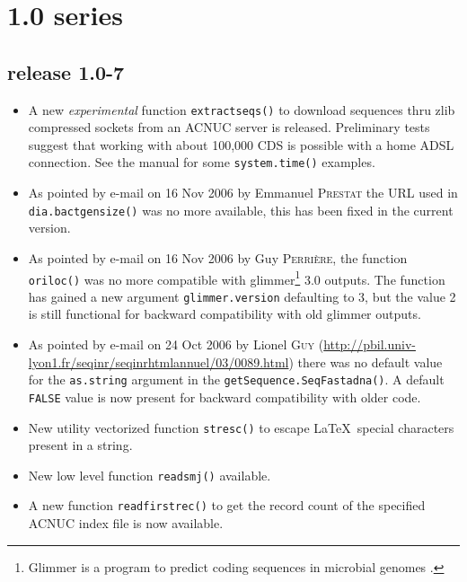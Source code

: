 \documentclass{article}
\begin{document}
\section*{1.0 series}

\subsection*{release 1.0-7}

\begin{itemize}

\item A new \emph{experimental} function \texttt{extractseqs()} to download
sequences thru zlib compressed sockets from an ACNUC server is released. 
Preliminary tests suggest that working with about 100,000 CDS is possible with 
a home ADSL connection. See the manual for some \texttt{system.time()}
examples.

\item As pointed by e-mail on 16 Nov 2006 by Emmanuel \textsc{Prestat} the URL
used in \texttt{dia.bactgensize()} was no more available, this has been fixed
in the current version.

\item As pointed by e-mail on 16 Nov 2006 by Guy \textsc{Perri{\`e}re}, the
function \texttt{oriloc()} was no more compatible with glimmer\footnote{
Glimmer is a program to predict coding sequences in microbial genomes \cite{SalzbergSL1998, DelcherAL1999}.
} 3.0
outputs. The function has gained a new argument \texttt{glimmer.version}
defaulting to 3, but the value 2 is still functional for backward compatibility
with old glimmer outputs.

\item As pointed by e-mail on 24 Oct 2006 by Lionel \textsc{Guy} 
(\url{http://pbil.univ-lyon1.fr/seqinr/seqinrhtmlannuel/03/0089.html})
there was no default value for the \texttt{as.string} argument in
the \texttt{getSequence.SeqFastadna()}. A default \texttt{FALSE}
value is now present for backward compatibility with older code.

\item New utility vectorized function \texttt{stresc()}  to escape \LaTeX~special 
characters present in a string.

\item New low level function \texttt{readsmj()} available.

\item A new function \texttt{readfirstrec()} to get 
the record count of the specified ACNUC index file is now available.


\end{itemize}
\end{document}
